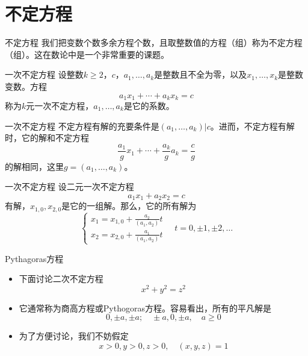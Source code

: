 \documentclass[dvipdfmx]{beamer}
\begin{document}
\section{不定方程}

\begin{frame}{不定方程}
我们把变数个数多余方程个数，且取整数值的方程（组）称为不定方程（组）。这在数论中是一个非常重要的课题。
\end{frame}

\begin{frame}{一次不定方程}
设整数$k\geq 2$，$c$，$a_1,\dotsc,a_k$是整数且不全为零，以及$x_1,\dotsc,x_k$是整数变数。方程
\begin{displaymath}
a_1x_1+\dotsb+a_kx_k=c
\end{displaymath}
称为$k$元一次不定方程，$a_1,\dotsc,a_k$是它的系数。
\end{frame}

\begin{frame}{一次不定方程}
不定方程有解的充要条件是$(a_1,\dotsc,a_k)|c$。进而，不定方程有解时，它的解和不定方程
\begin{displaymath}
\frac{a_1}{g}x_1+\dotsb+\frac{a_k}{g}a_k=\frac{c}{g}
\end{displaymath}
的解相同，这里$g=(a_1,\dotsc,a_k)$。
\end{frame}

\begin{frame}{一次不定方程}
设二元一次不定方程
\begin{displaymath}
a_1x_1+a_2x_2=c
\end{displaymath}
有解，$x_{1,0},x_{2,0}$是它的一组解。那么，它的所有解为
\begin{displaymath}
\left\{
\begin{array}{l}
x_1 = x_{1,0}+\frac{a_2}{(a_1,a_2)}t\\
x_2 = x_{2,0}+\frac{a_1}{(a_1,a_2)}t
\end{array}
\right.
\quad t=0,\pm 1,\pm 2,\dotsc
\end{displaymath}
\end{frame}

\begin{frame}{Pythagoras方程}
\begin{itemize}
\item 下面讨论二次不定方程
\begin{displaymath}
x^2+y^2=z^2
\end{displaymath}
\item 它通常称为商高方程或Pythogoras方程。容易看出，所有的平凡解是
\begin{displaymath}
0,\pm a,\pm a;\quad \pm a,0,\pm a,\quad a\geq 0
\end{displaymath}
\pause
\item 为了方便讨论，我们不妨假定
\begin{displaymath}
x>0,y>0,z>0,\quad (x,y,z)=1
\end{displaymath}
\end{itemize}
\end{frame}
\end{document}
